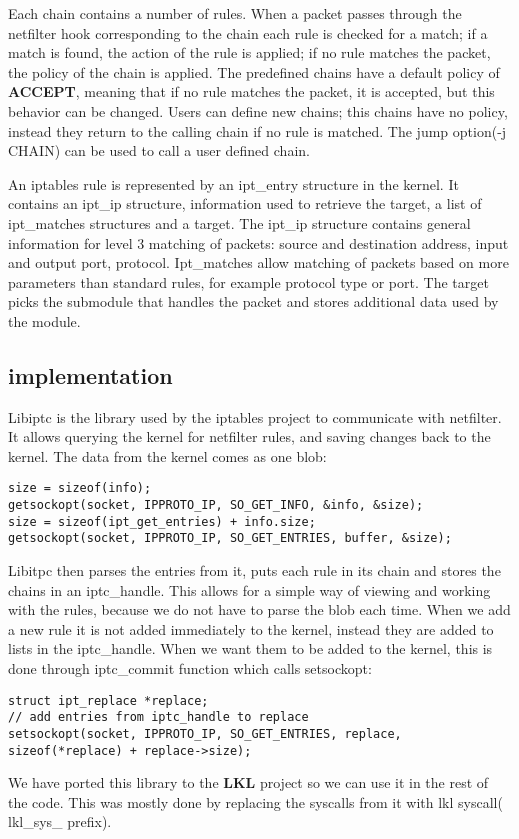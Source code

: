 Each chain contains a number of rules. When a packet passes through the netfilter hook corresponding to the chain each rule is checked
for a match; if a match is found, the action of the rule is applied; if no rule matches the packet, the policy of the chain is applied.
The predefined chains have a default policy of \textbf{ACCEPT}, meaning that if no rule matches the packet, it is accepted, but this behavior
can be changed. Users can define new chains; this chains have no policy, instead they return to the calling chain if no rule is matched.
The jump option(-j CHAIN) can be used to call a user defined chain.

An iptables rule is represented by an ipt_entry structure in the kernel. It contains an ipt_ip structure, information used
to retrieve the target, a list of ipt_matches structures and a target. The ipt_ip structure contains general information for
level 3 matching of packets: source and destination address, input and output port, protocol. Ipt_matches allow matching of
packets based on more parameters than standard rules, for example protocol type or port. The target picks the submodule that 
handles the packet and stores additional data used by the module.

\subsection{\text{\project} implementation}
\label{sub-sec:firewall-lkl}

Libiptc is the library used by the iptables project to communicate with netfilter. It allows
querying the kernel for netfilter rules, and saving changes back to the kernel. The data from
the kernel comes as one blob:
\lstset{language=C,caption=Getting firewall rules,label=lst:sgetrule}
\begin{lstlisting}
size = sizeof(info);
getsockopt(socket, IPPROTO_IP, SO_GET_INFO, &info, &size); 
size = sizeof(ipt_get_entries) + info.size;
getsockopt(socket, IPPROTO_IP, SO_GET_ENTRIES, buffer, &size);
\end{lstlisting}
Libitpc then parses the entries from it, puts each rule in its chain and stores the chains in an iptc_handle. 
This allows for a simple way of viewing and working with the rules, because we do not have to parse the blob 
each time. When we add a new rule it is not added immediately to the kernel, instead they are added to 
lists in the iptc_handle. When we want them to be added to the kernel, this is done through iptc_commit function
which calls setsockopt:
\lstset{language=C,caption=Committing changes,label=lst:ssetrules}
\begin{lstlisting}
struct ipt_replace *replace;
// add entries from iptc_handle to replace
setsockopt(socket, IPPROTO_IP, SO_GET_ENTRIES, replace, sizeof(*replace) + replace->size);
\end{lstlisting}
We have ported this library to the \textbf{LKL} project so we can use it in the rest of the code. This was mostly done by replacing
the syscalls from it with lkl syscall( lkl_sys_ prefix).


